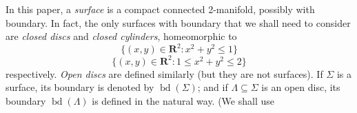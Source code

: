 In this paper, a \textit{surface} is a compact connected 2-manifold, possibly with boundary. In fact, the only surfaces with boundary that we shall need to consider are \textit{closed discs} and \textit{closed cylinders}, homeomorphic to
\begin{equation*}
\{(x, y) \in \mathbf{R}^2 \colon x^2 + y^2 \le 1\}
\end{equation*}
\begin{equation*}
\{(x, y) \in \mathbf{R}^2 \colon 1 \le x^2 + y^2 \le 2\}
\end{equation*}
respectively. \textit{Open discs} are defined similarly (but they are not surfaces). If $\Sigma$ is a surface, its boundary is denoted by $\operatorname{bd}(\Sigma)$; and if $\Lambda \subseteq \Sigma$ is an open disc, its boundary $\operatorname{bd}(\Lambda)$ is defined in the natural way. (We shall use
